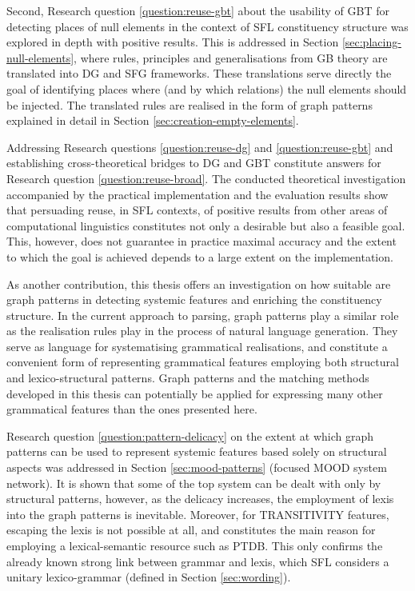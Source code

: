    Second, Research question \ref{question:reuse-gbt} about the usability of GBT for detecting places of null elements in the context of SFL constituency structure was explored in depth with positive results. This is addressed in Section \ref{sec:placing-null-elements}, where rules, principles and generalisations from GB theory are translated into DG and SFG frameworks. These translations serve directly the goal of identifying places where (and by which relations) the null elements should be injected. The translated rules are realised in the form of graph patterns explained in detail in Section \ref{sec:creation-empty-elements}.

    Addressing Research questions \ref{question:reuse-dg} and \ref{question:reuse-gbt}
    and establishing cross-theoretical bridges to DG and GBT constitute answers for Research question \ref{question:reuse-broad}. The conducted theoretical investigation accompanied by the practical implementation and the evaluation results show that persuading reuse, in SFL contexts, of positive results from other areas of computational linguistics constitutes not only a desirable but also a feasible goal. This, however, does not guarantee in practice maximal accuracy and the extent to which the goal is achieved depends to a large extent on the implementation. 
    
    As another contribution, this thesis offers an investigation on how suitable are graph patterns in detecting systemic features and enriching the constituency structure. In the current approach to parsing, graph patterns play a similar role as the realisation rules play in the process of natural language generation. They serve as language for systematising grammatical realisations, and constitute a convenient form of representing grammatical features employing both structural and lexico-structural patterns. Graph patterns and the matching methods developed in this thesis can potentially be applied for expressing many other grammatical features than the ones presented here.

    Research question \ref{question:pattern-delicacy} on the extent at which graph patterns can be used to represent systemic features based solely on structural aspects was addressed in Section \ref{sec:mood-patterns} (focused MOOD system network). It is shown that some of the top system can be dealt with only by structural patterns, however, as the delicacy increases, the employment of lexis into the graph patterns is inevitable. Moreover, for TRANSITIVITY features, escaping the lexis is not possible at all, and constitutes the main reason for employing a lexical-semantic resource such as PTDB. This only confirms the already known strong link between grammar and lexis, which SFL considers a unitary lexico-grammar (defined in Section \ref{sec:wording}).

